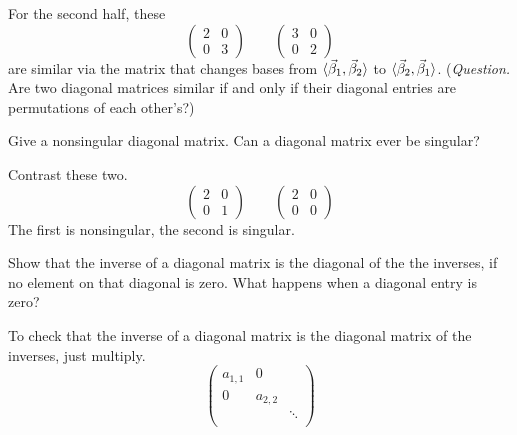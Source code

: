 \begin{exercises}
\begin{answer}
       For the second half, these
       \begin{equation*}
          \begin{pmatrix}
             2  &0  \\
             0  &3
          \end{pmatrix}
          \qquad
          \begin{pmatrix}
             3  &0  \\
             0  &2
          \end{pmatrix}
       \end{equation*}
       are similar via the matrix that changes bases from
       \( \langle\vec{\beta}_1,\vec{\beta}_2\rangle \) to
       \( \langle\vec{\beta}_2,\vec{\beta}_1\rangle \).
       (\textit{Question.}
        Are two diagonal matrices similar if and only if their diagonal
        entries are permutations of each other's?)  
    \end{answer}
  \item 
    Give a nonsingular diagonal matrix.
    Can a diagonal matrix ever be singular?
    \begin{answer}
      Contrast these two.
      \begin{equation*}
         \begin{pmatrix}
           2  &0  \\
           0  &1
         \end{pmatrix}
         \qquad
         \begin{pmatrix}
           2  &0  \\
           0  &0
         \end{pmatrix}
      \end{equation*}
      The first is nonsingular, the second is singular.  
     \end{answer}
  \recommended \item
    Show that the inverse of a diagonal matrix is the diagonal of the
    the inverses, if no element on that diagonal is zero.
    What happens when a diagonal entry is zero?
    \begin{answer}  
       To check that the inverse of a diagonal matrix is the diagonal
       matrix of the inverses, just multiply.
       \begin{equation*}
          \begin{pmatrix}
             a_{1,1}  &0                \\
             0        &a_{2,2}          \\
                      &       &\ddots    \\

\end{pmatrix}
\end{equation*}
\end{answer}
\end{exercises}

